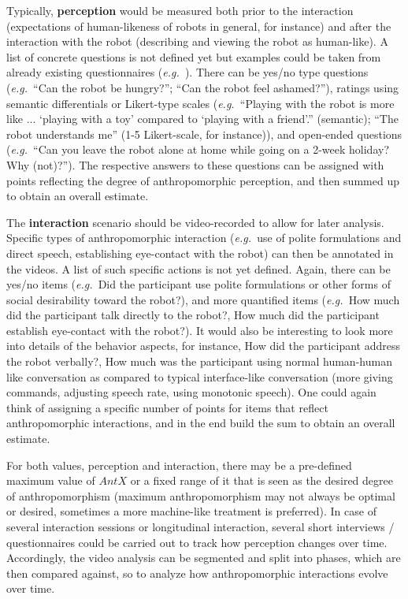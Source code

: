 \documentclass{frontiersSCNS} %
\newcommand{\eg}{{\textit{e.g.~}}}
\begin{document}
Typically, \textbf{perception} would be measured both prior to the interaction (expectations of human-likeness of robots in general, for instance) and after the interaction with the robot (describing and viewing the robot as human-like). A list of concrete questions is not defined yet but examples could be taken from already existing questionnaires (\eg \cite{bartneck_measurement_2008,weiss_i_2009,kahn_jr._robotic_2006,ruijten_introducing_2014}).
There can be yes/no type questions (\eg ``Can the robot be hungry?''; ``Can the robot feel ashamed?''), ratings using semantic differentials or Likert-type scales (\eg ``Playing with the robot is more like ... `playing with a toy' compared to `playing with a friend'.'' (semantic); ``The robot understands me'' (1-5 Likert-scale, for instance)), and open-ended questions (\eg ``Can you leave the robot alone at home while going on a 2-week holiday? Why (not)?''). The respective answers to these questions can be assigned with points reflecting the degree of anthropomorphic perception, and then summed up to obtain an overall estimate.

The \textbf{interaction} scenario should be video-recorded to allow for later analysis. Specific types of anthropomorphic interaction (\eg use of polite formulations and direct speech, establishing eye-contact with the robot) can then be annotated in the videos. A list of such specific actions is not yet defined. Again, there can be yes/no items (\eg Did the participant use polite formulations or other forms of social desirability toward the robot?), and more quantified items (\eg How much did the participant talk directly to the robot?, How much did the participant establish eye-contact with the robot?). It would also be interesting to look more into details of the behavior aspects, for instance, How did the participant address the robot verbally?, How much was the participant using normal human-human like conversation as compared to typical interface-like conversation (more giving commands, adjusting speech rate, using monotonic speech). One could again think of assigning a specific number of points for items that reflect anthropomorphic interactions, and in the end build the sum to obtain an overall estimate.

For both values, perception and interaction, there may be a pre-defined maximum value of $AntX$ or a fixed range of it that is seen as the desired degree of anthropomorphism (maximum anthropomorphism may not always be optimal or desired, sometimes a more machine-like treatment is preferred). In case of several interaction sessions or longitudinal interaction, several short interviews / questionnaires could be carried out to track how perception changes over time. Accordingly, the video analysis can be segmented and split into phases, which are then compared against, so to analyze how anthropomorphic interactions evolve over time.
\end{document}

